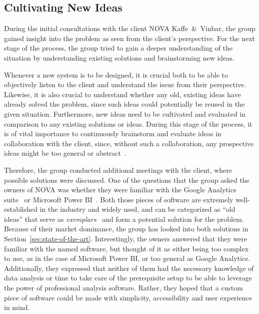 \subsection{Cultivating New Ideas}\label{subsec:cultivating-new-ideas}

During the initial consultations with the client NOVA Kaffe~\&~Vinbar, the group gained insight into the problem as seen
from the client's perspective.
For the next stage of the process, the group tried to gain a deeper understanding of the situation by
understanding existing solutions and brainstorming new ideas.

Whenever a new system is to be designed, it is crucial both to be able to objectively listen to the client and
understand the issue from their perspective.
Likewise, it is also crucial to understand whether any old, existing ideas have already solved the problem, since such
ideas could potentially be reused in the given situation.
Furthermore, new ideas need to be cultivated and evaluated in comparison to any existing solutions or ideas.
During this stage of the process, it is of vital importance to continuously brainstorm and evaluate ideas in
collaboration with the client, since, without such a collaboration, any prospective ideas might be too general or
abstract~\cite[32]{mathiassen2018}.

Therefore, the group conducted additional meetings with the client, where possible solutions were discussed.
One of the questions that the group asked the owners of NOVA was whether they were familiar with the Google Analytics
suite~\cite{ga4} or Microsoft Power BI~\cite{power-bi}.
Both those pieces of software are extremely well-established in the industry and widely used, and can be categorized as
``old ideas'' that serve as \textit{exemplars}~\cite[33]{mathiassen2018} and form a potential solution for the problem.
Because of their market dominance, the group has looked into both solutions in Section~\ref{sec:state-of-the-art}.
Interestingly, the owners answered that they were familiar with the named software, but thought of it as either being
too complex to use, as in the case of Microsoft Power BI, or too general as Google Analytics.
Additionally, they expressed that neither of them had the necessary knowledge of data analysis or time to take care of
the prerequisite setup to be able to leverage the power of professional analysis software.
Rather, they hoped that a custom piece of software could be made with simplicity, accessibility and user experience in
mind.

